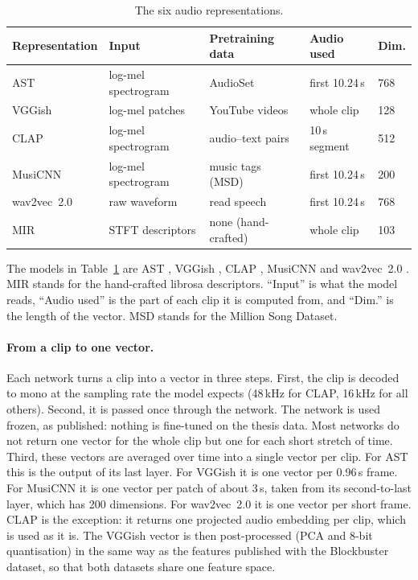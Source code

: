\begin{table}[H]
  \centering
  \small
  \caption{The six audio representations.}
  \label{tab:representations}
  \setlength{\tabcolsep}{4pt}
  \begin{tabular}{lllll}
    \toprule
    Representation & Input & Pretraining data & Audio used & Dim. \\
    \midrule
    AST         & log-mel spectrogram & AudioSet            & first 10.24\,s & 768 \\
    VGGish      & log-mel patches     & YouTube videos      & whole clip     & 128 \\
    CLAP        & log-mel spectrogram & audio--text pairs   & 10\,s segment  & 512 \\
    MusiCNN     & log-mel spectrogram & music tags (MSD)    & first 10.24\,s & 200 \\
    wav2vec~2.0 & raw waveform        & read speech         & first 10.24\,s & 768 \\
    MIR         & STFT descriptors    & none (hand-crafted) & whole clip     & 103 \\
    \bottomrule
  \end{tabular}
\end{table}

The models in Table~\ref{tab:representations} are AST \citep{gong2021ast}, VGGish \citep{hershey2017cnn}, CLAP \citep{wu2023clap}, MusiCNN \citep{pons2019musicnn} and wav2vec~2.0 \citep{baevski2020wav2vec}. MIR stands for the hand-crafted librosa descriptors. ``Input'' is what the model reads, ``Audio used'' is the part of each clip it is computed from, and ``Dim.'' is the length of the vector. MSD stands for the Million Song Dataset.

\paragraph{From a clip to one vector.} Each network turns a clip into a vector in three steps. First, the clip is decoded to mono at the sampling rate the model expects (48\,kHz for CLAP, 16\,kHz for all others). Second, it is passed once through the network. The network is used frozen, as published: nothing is fine-tuned on the thesis data. Most networks do not return one vector for the whole clip but one for each short stretch of time. Third, these vectors are averaged over time into a single vector per clip. For AST this is the output of its last layer. For VGGish it is one vector per 0.96\,s frame. For MusiCNN it is one vector per patch of about 3\,s, taken from its second-to-last layer, which has 200 dimensions. For wav2vec~2.0 it is one vector per short frame. CLAP is the exception: it returns one projected audio embedding per clip, which is used as it is. The VGGish vector is then post-processed (PCA and 8-bit quantisation) in the same way as the features published with the Blockbuster dataset, so that both datasets share one feature space.

